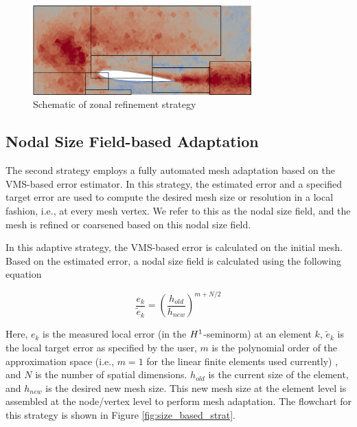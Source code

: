 \begin{figure}[H]
	\centering
	\includegraphics[width=0.75\textwidth]{figures/adapt_strat/zonal_based_schematic.png}
	\caption{Schematic of zonal refinement strategy}
	\label{fig:zonal_based_strat_schematic}
\end{figure}

\subsection{Nodal Size Field-based Adaptation}

The second strategy employs a fully automated mesh adaptation based on the VMS-based error estimator. In this strategy, the estimated error and a specified target error are used to compute the desired mesh size or resolution in a local fashion, i.e., at every mesh vertex. We refer to this as the nodal size field, and the mesh is refined or coarsened based on this nodal size field. 

In this adaptive strategy, the VMS-based error is calculated on the initial mesh. Based on the estimated error, a nodal size field is calculated using the following equation \cite{zhang19}

\begin{equation}
	\frac{e_k}{\tilde{e}_k} = \left(\frac{h_{old}}{h_{new}}\right)^{m+N/2} 
	\label{eq:diez}
\end{equation}

Here, $e_k$ is the measured local error (in the $H^{1}$-seminorm) at an element $k$, $\tilde{e}_k$ is the local target error as specified by the user, $m$ is the polynomial order of the approximation space (i.e., $m=1$ for the linear finite elements used currently) , and $N$ is the number of spatial dimensions. $h_{old}$ is the current size of the element, and $h_{new}$ is the desired new mesh size.
This new mesh size at the element level is assembled at the node/vertex level to perform mesh adaptation.
The flowchart for this strategy is shown in Figure \ref{fig:size_based_strat}.

